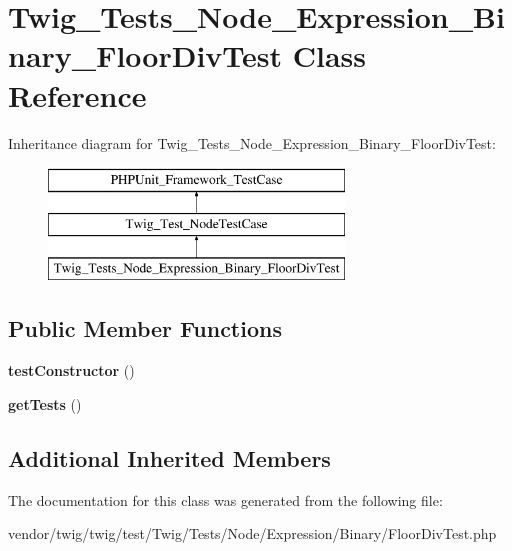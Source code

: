 \hypertarget{classTwig__Tests__Node__Expression__Binary__FloorDivTest}{}\section{Twig\+\_\+\+Tests\+\_\+\+Node\+\_\+\+Expression\+\_\+\+Binary\+\_\+\+Floor\+Div\+Test Class Reference}
\label{classTwig__Tests__Node__Expression__Binary__FloorDivTest}
Inheritance diagram for Twig\+\_\+\+Tests\+\_\+\+Node\+\_\+\+Expression\+\_\+\+Binary\+\_\+\+Floor\+Div\+Test\+:\begin{figure}[H]
\begin{center}
\leavevmode
\includegraphics[height=3.000000cm]{classTwig__Tests__Node__Expression__Binary__FloorDivTest}
\end{center}
\end{figure}
\subsection*{Public Member Functions}
\begin{DoxyCompactItemize}
\item 
{\bfseries test\+Constructor} ()\hypertarget{classTwig__Tests__Node__Expression__Binary__FloorDivTest_a3d445769b7f26f56a9a8abf131ce8019}{}\label{classTwig__Tests__Node__Expression__Binary__FloorDivTest_a3d445769b7f26f56a9a8abf131ce8019}

\item 
{\bfseries get\+Tests} ()\hypertarget{classTwig__Tests__Node__Expression__Binary__FloorDivTest_a1a4d060e601a082c474961d5fd100eff}{}\label{classTwig__Tests__Node__Expression__Binary__FloorDivTest_a1a4d060e601a082c474961d5fd100eff}

\end{DoxyCompactItemize}
\subsection*{Additional Inherited Members}


The documentation for this class was generated from the following file\+:\begin{DoxyCompactItemize}
\item 
vendor/twig/twig/test/\+Twig/\+Tests/\+Node/\+Expression/\+Binary/Floor\+Div\+Test.\+php\end{DoxyCompactItemize}
